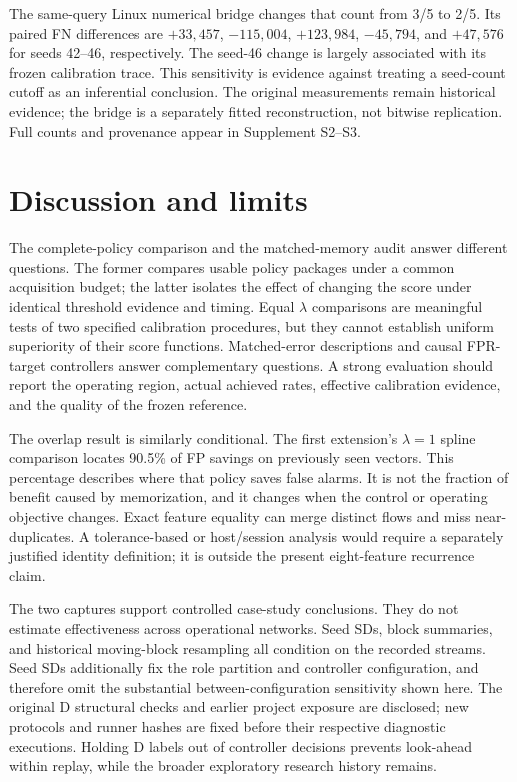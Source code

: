The same-query Linux numerical bridge changes that count from 3/5 to 2/5. Its paired FN differences are $+33{,}457$, $-115{,}004$, $+123{,}984$, $-45{,}794$, and $+47{,}576$ for seeds 42--46, respectively. The seed-46 change is largely associated with its frozen calibration trace. This sensitivity is evidence against treating a seed-count cutoff as an inferential conclusion. The original measurements remain historical evidence; the bridge is a separately fitted reconstruction, not bitwise replication. Full counts and provenance appear in Supplement S2--S3.

\section{Discussion and limits}
The complete-policy comparison and the matched-memory audit answer different questions. The former compares usable policy packages under a common acquisition budget; the latter isolates the effect of changing the score under identical threshold evidence and timing. Equal $\lambda$ comparisons are meaningful tests of two specified calibration procedures, but they cannot establish uniform superiority of their score functions. Matched-error descriptions and causal FPR-target controllers answer complementary questions. A strong evaluation should report the operating region, actual achieved rates, effective calibration evidence, and the quality of the frozen reference.

The overlap result is similarly conditional. The first extension's $\lambda=1$ spline comparison locates 90.5\% of FP savings on previously seen vectors. This percentage describes where that policy saves false alarms. It is not the fraction of benefit caused by memorization, and it changes when the control or operating objective changes. Exact feature equality can merge distinct flows and miss near-duplicates. A tolerance-based or host/session analysis would require a separately justified identity definition; it is outside the present eight-feature recurrence claim.

The two captures support controlled case-study conclusions. They do not estimate effectiveness across operational networks. Seed SDs, block summaries, and historical moving-block resampling all condition on the recorded streams. Seed SDs additionally fix the role partition and controller configuration, and therefore omit the substantial between-configuration sensitivity shown here. The original D structural checks and earlier project exposure are disclosed; new protocols and runner hashes are fixed before their respective diagnostic executions. Holding D labels out of controller decisions prevents look-ahead within replay, while the broader exploratory research history remains.

